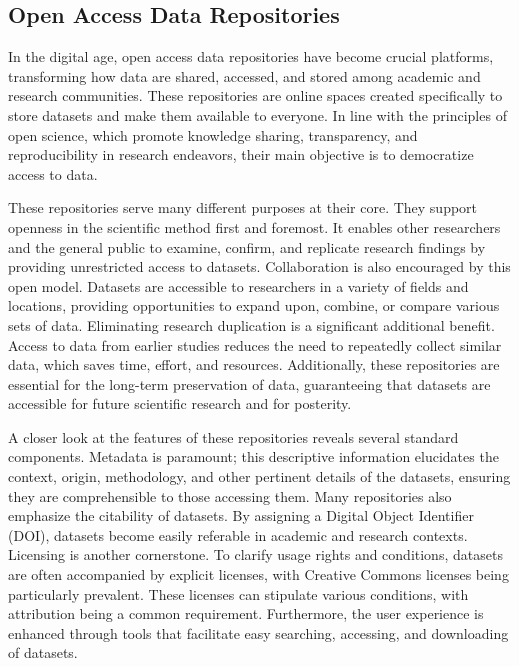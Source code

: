 \documentclass[print]{nuthesis}
\begin{document}
\hypertarget{open-access-data-repositories}{%
\subsection{Open Access Data Repositories}\label{open-access-data-repositories}}

In the digital age, open access data repositories have become crucial platforms, transforming how data are shared, accessed, and stored among academic and research communities.
These repositories are online spaces created specifically to store datasets and make them available to everyone. In line with the principles of open science, which promote knowledge sharing, transparency, and reproducibility in research endeavors, their main objective is to democratize access to data.

These repositories serve many different purposes at their core.
They support openness in the scientific method first and foremost.
It enables other researchers and the general public to examine, confirm, and replicate research findings by providing unrestricted access to datasets. Collaboration is also encouraged by this open model.
Datasets are accessible to researchers in a variety of fields and locations, providing opportunities to expand upon, combine, or compare various sets of data.
Eliminating research duplication is a significant additional benefit.
Access to data from earlier studies reduces the need to repeatedly collect similar data, which saves time, effort, and resources.
Additionally, these repositories are essential for the long-term preservation of data, guaranteeing that datasets are accessible for future scientific research and for posterity.

A closer look at the features of these repositories reveals several standard components.
Metadata is paramount; this descriptive information elucidates the context, origin, methodology, and other pertinent details of the datasets, ensuring they are comprehensible to those accessing them.
Many repositories also emphasize the citability of datasets.
By assigning a Digital Object Identifier (DOI), datasets become easily referable in academic and research contexts.
Licensing is another cornerstone. To clarify usage rights and conditions, datasets are often accompanied by explicit licenses, with Creative Commons licenses being particularly prevalent.
These licenses can stipulate various conditions, with attribution being a common requirement.
Furthermore, the user experience is enhanced through tools that facilitate easy searching, accessing, and downloading of datasets.
\end{document}
